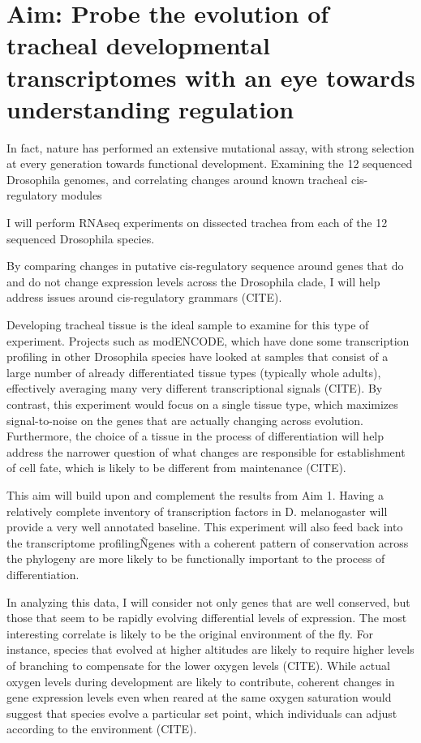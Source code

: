 \documentclass{proposal}
\begin{document}
\section{Aim: Probe the evolution of tracheal developmental transcriptomes with an eye towards understanding regulation}
In fact, nature has performed an extensive mutational assay, with strong selection at every generation towards functional development.  Examining the 12 sequenced Drosophila genomes, and correlating changes around known tracheal cis-regulatory modules 

I will perform RNAseq experiments on dissected trachea from each of the 12 sequenced Drosophila species.  

By comparing changes in putative cis-regulatory sequence around genes that do and do not change expression levels across the Drosophila clade, I will help address issues around cis-regulatory grammars (CITE). 

Developing tracheal tissue is the ideal sample to examine for this type of experiment.  Projects such as modENCODE, which have done some transcription profiling in other Drosophila species have looked at samples that consist of a large number of already differentiated tissue types (typically whole adults), effectively averaging many very different transcriptional signals (CITE).  By contrast, this experiment would focus on a single tissue type, which maximizes signal-to-noise on the genes that are actually changing across evolution.  Furthermore, the choice of a tissue in the process of differentiation will help address the narrower question of what changes are responsible for establishment of cell fate, which is likely to be different from maintenance (CITE). 

This aim will build upon and complement the results from Aim 1.  Having a relatively complete inventory of transcription factors in D. melanogaster will provide a very well annotated baseline.   This experiment will also feed back into the transcriptome profilingÑgenes with a coherent pattern of conservation across the phylogeny are more likely to be functionally important to the process of differentiation.

 In analyzing this data, I will consider not only genes that are well conserved, but those that seem to be rapidly evolving differential levels of expression.  The most interesting correlate is likely to be the original environment of the fly.  For instance, species that evolved at higher altitudes are likely to require higher levels of branching to compensate for the lower oxygen levels (CITE).  While actual oxygen levels during development are likely to contribute, coherent changes in gene expression levels even when reared at the same oxygen saturation would suggest that species evolve a particular set point, which individuals can adjust according to the environment (CITE). 
\end{document}
